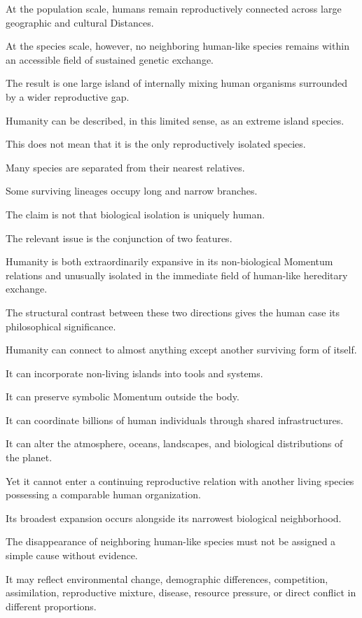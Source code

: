 At the population scale, humans remain reproductively connected across large geographic and cultural Distances.

At the species scale, however, no neighboring human-like species remains within an accessible field of sustained genetic exchange.

The result is one large island of internally mixing human organisms surrounded by a wider reproductive gap.

Humanity can be described, in this limited sense, as an extreme island species.

This does not mean that it is the only reproductively isolated species.

Many species are separated from their nearest relatives.

Some surviving lineages occupy long and narrow branches.

The claim is not that biological isolation is uniquely human.

The relevant issue is the conjunction of two features.

Humanity is both extraordinarily expansive in its non-biological Momentum relations and unusually isolated in the immediate field of human-like hereditary exchange.

The structural contrast between these two directions gives the human case its philosophical significance.

Humanity can connect to almost anything except another surviving form of itself.

It can incorporate non-living islands into tools and systems.

It can preserve symbolic Momentum outside the body.

It can coordinate billions of human individuals through shared infrastructures.

It can alter the atmosphere, oceans, landscapes, and biological distributions of the planet.

Yet it cannot enter a continuing reproductive relation with another living species possessing a comparable human organization.

Its broadest expansion occurs alongside its narrowest biological neighborhood.

The disappearance of neighboring human-like species must not be assigned a simple cause without evidence.

It may reflect environmental change, demographic differences, competition, assimilation, reproductive mixture, disease, resource pressure, or direct conflict in different proportions.

